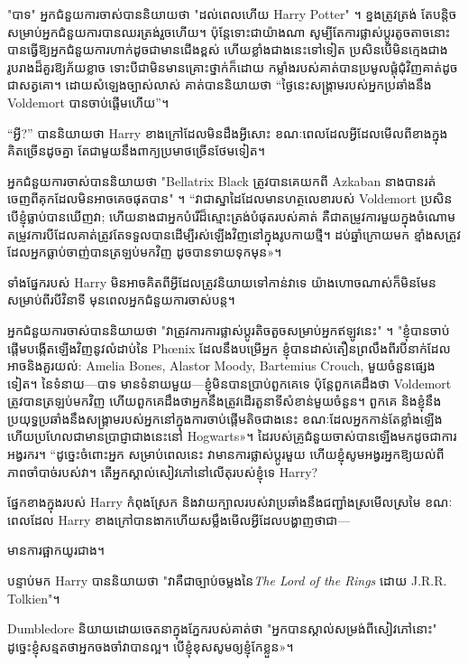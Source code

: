 {"បាទ" អ្នកជំនួយការចាស់បាននិយាយថា "ដល់ពេលហើយ Harry Potter" ។ ខ្នងត្រូវត្រង់ តែបន្តិចសម្រាប់អ្នកជំនួយការបានឈរត្រង់រួចហើយ។ ប៉ុន្តែទោះជាយ៉ាងណា សូម្បីតែការផ្លាស់ប្តូរតូចតាចនោះ បានធ្វើឱ្យអ្នកជំនួយការហាក់ដូចជាមានជើងខ្ពស់ ហើយខ្លាំងជាងនេះទៅទៀត ប្រសិនបើមិនក្មេងជាង រូបរាងដ៏គួរឱ្យភ័យខ្លាច ទោះបីជាមិនមានគ្រោះថ្នាក់ក៏ដោយ កម្លាំងរបស់គាត់បានប្រមូលផ្តុំជុំវិញគាត់ដូចជាសត្វគោ។ ដោយ​សំឡេង​ច្បាស់​លាស់ គាត់​បាន​និយាយ​ថា “ថ្ងៃ​នេះ​សង្គ្រាម​របស់​អ្នក​ប្រឆាំង​នឹង Voldemort បាន​ចាប់​ផ្តើម​ហើយ”។

“អ្វី?” បាននិយាយថា Harry ខាងក្រៅដែលមិនដឹងអ្វីសោះ ខណៈពេលដែលអ្វីដែលមើលពីខាងក្នុងគិតច្រើនដូចគ្នា តែជាមួយនឹងពាក្យប្រមាថច្រើនថែមទៀត។

អ្នកជំនួយការចាស់បាននិយាយថា "Bellatrix Black ត្រូវបានគេយកពី Azkaban នាងបានរត់ចេញពីគុកដែលមិនអាចគេចផុតបាន" ។ “វា​ជា​ស្នាដៃ​ដែល​មាន​ហត្ថលេខា​របស់ Voldemort ប្រសិន​បើ​ខ្ញុំ​ធ្លាប់​បាន​ឃើញ​វា; ហើយនាងជាអ្នកបំរើដ៏ស្មោះត្រង់បំផុតរបស់គាត់ គឺជាតម្រូវការមួយក្នុងចំណោមតម្រូវការបីដែលគាត់ត្រូវតែទទួលបានដើម្បីរស់ឡើងវិញនៅក្នុងរូបកាយថ្មី។ ដប់ឆ្នាំក្រោយមក ខ្មាំងសត្រូវដែលអ្នកធ្លាប់ចាញ់បានត្រឡប់មកវិញ ដូចបានទាយទុកមុន»។

ទាំងផ្នែករបស់ Harry មិនអាចគិតពីអ្វីដែលត្រូវនិយាយទៅកាន់វាទេ យ៉ាងហោចណាស់ក៏មិនមែនសម្រាប់ពីរបីវិនាទី មុនពេលអ្នកជំនួយការចាស់បន្ត។

អ្នកជំនួយការចាស់បាននិយាយថា "វាត្រូវការការផ្លាស់ប្តូរតិចតួចសម្រាប់អ្នកឥឡូវនេះ" ។ "ខ្ញុំបានចាប់ផ្តើមបង្កើតឡើងវិញនូវលំដាប់នៃ Phœnix ដែលនឹងបម្រើអ្នក ខ្ញុំបានដាស់តឿនព្រលឹងពីរបីនាក់ដែលអាចនិងគួរយល់: Amelia Bones, Alastor Moody, Bartemius Crouch, មួយចំនួនផ្សេងទៀត។ នៃទំនាយ—បាទ មានទំនាយមួយ—ខ្ញុំមិនបានប្រាប់ពួកគេទេ ប៉ុន្តែពួកគេដឹងថា Voldemort ត្រូវបានត្រឡប់មកវិញ ហើយពួកគេដឹងថាអ្នកនឹងត្រូវដើរតួនាទីសំខាន់មួយចំនួន។ ពួកគេ និង​ខ្ញុំ​នឹង​ប្រយុទ្ធ​ប្រឆាំង​នឹង​សង្រ្គាម​របស់​អ្នក​នៅ​ក្នុង​ការ​ចាប់​ផ្តើម​តិច​ជាង​នេះ ខណៈ​ដែល​អ្នក​កាន់​តែ​ខ្លាំង​ឡើង ហើយ​ប្រហែល​ជា​មាន​ប្រាជ្ញា​ជាង​នេះ​នៅ​ Hogwarts»។ ដៃ​របស់​គ្រូ​ជំនួយ​ចាស់​បាន​ឡើង​មក​ដូច​ជា​ការ​អង្វរករ។ “ដូច្នេះចំពោះអ្នក សម្រាប់ពេលនេះ វាមានការផ្លាស់ប្ដូរមួយ ហើយខ្ញុំសូមអង្វរអ្នកឱ្យយល់ពីភាពចាំបាច់របស់វា។ តើអ្នកស្គាល់សៀវភៅនៅលើតុរបស់ខ្ញុំទេ Harry?

ផ្នែកខាងក្នុងរបស់ Harry កំពុងស្រែក និងវាយក្បាលរបស់វាប្រឆាំងនឹងជញ្ជាំងស្រមើលស្រមៃ ខណៈពេលដែល Harry ខាងក្រៅបានងាកហើយសម្លឹងមើលអ្វីដែលបង្ហាញថាជា—

មានការផ្អាកយូរជាង។

បន្ទាប់មក Harry បាននិយាយថា "វាគឺជាច្បាប់ចម្លងនៃ\emph{The Lord of the Rings} ដោយ J.R.R. Tolkien"។

Dumbledore និយាយដោយចេតនាក្នុងភ្នែករបស់គាត់ថា "អ្នកបានស្គាល់សម្រង់ពីសៀវភៅនោះ" ដូច្នេះខ្ញុំសន្មតថាអ្នកចងចាំវាបានល្អ។ បើ​ខ្ញុំ​ខុស​សូម​ឲ្យ​ខ្ញុំ​កែ​ខ្លួន»។

}
